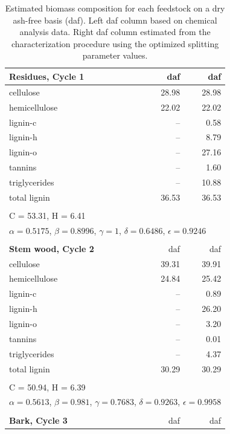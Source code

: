 \documentclass[12pt,titlepage]{article}
\begin{document}
\begin{longtable}{p{8cm}rr}
    \caption{Estimated biomass composition for each feedstock on a dry ash-free basis (daf). Left daf column based on chemical analysis data. Right daf column estimated from the characterization procedure using the optimized splitting parameter values.}
    \label{tab:biocomp3} \\
    \textbf{Residues, Cycle 1} & daf & daf \\
    \midrule
    cellulose       & 28.98  & 28.98 \\
    hemicellulose   & 22.02  & 22.02 \\
    lignin-c        & --     & 0.58 \\
    lignin-h        & --     & 8.79 \\
    lignin-o        & --     & 27.16 \\
    tannins         & --     & 1.60 \\
    triglycerides   & --     & 10.88 \\
    total lignin    & 36.53  & 36.53 \\
    \\
    \multicolumn{3}{l}{C = 53.31, H = 6.41} \\
    \multicolumn{3}{l}{$\alpha = 0.5175$, $\beta = 0.8996$, $\gamma = 1$, $\delta = 0.6486$, $\epsilon = 0.9246$} \\
    \\
    \textbf{Stem wood, Cycle 2} & daf & daf \\
    \midrule
    cellulose     & 39.31 & 39.91 \\
    hemicellulose & 24.84 & 25.42 \\
    lignin-c      & --    & 0.89 \\
    lignin-h      & --    & 26.20 \\
    lignin-o      & --    & 3.20 \\
    tannins       & --    & 0.01 \\
    triglycerides & --    & 4.37 \\
    total lignin  & 30.29 & 30.29 \\
    \\
    \multicolumn{3}{l}{C = 50.94, H = 6.39} \\
    \multicolumn{3}{l}{$\alpha = 0.5613$, $\beta = 0.981$, $\gamma = 0.7683$, $\delta = 0.9263$, $\epsilon = 0.9958$} \\
    \\
    \textbf{Bark, Cycle 3} & daf & daf \\

\end{longtable}
\end{document}
